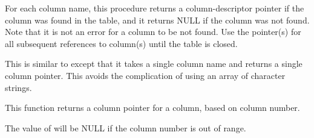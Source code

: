 For each column name, this procedure returns a column-descriptor pointer
if the column was found in the table,
and it returns NULL if the column was not found.
Note that it is not an error for a column to be not found.
Use the  pointer(s) for all subsequent references
to column(s) until the table is closed.

\callseqtable


\begin{callseq}
\end{callseq}

This is similar to  except that it takes a single column
name and returns a single column pointer.
This avoids the complication of using an array of character strings.

\callseqtable

\begin{callseq}
\end{callseq}

This function returns a column pointer for a column, based on column number.

\callseqfcn

The value of  will be NULL if the column number is out
of range.

\begin{callseq}
\end{callseq}

